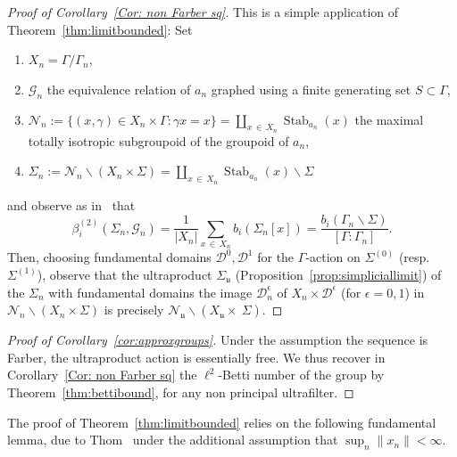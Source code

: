 \documentclass[10pt]{amsart}
\theoremstyle{definition}
\newcommand{\cn}{\mathcal{N}}
\newcommand{\cg}{\mathcal{G}}
\newcommand{\cd}{\mathcal{D}}
\DeclareMathOperator{\Stab}{Stab}
\newcommand{\ul}{\mathfrak{u}}
\newcommand*{\alphenumi}{\renewcommand*{\theenumi}{\alph{enumi}}}
\begin{document}
\begin{proof}[Proof of Corollary~\ref{Cor: non Farber sq}]
This is a simple application of Theorem~\ref{thm:limitbounded}: Set
\begin{enumerate}\alphenumi
\item $X_n=\Gamma/\Gamma_n$,
\item $\cg_n$ the equivalence relation of $a_n$ graphed using a finite generating set $S\subset \Gamma$,
\item $\cn_n:=\{(x,\gamma)\in X_{n}\times \Gamma: \gamma x=x\} =\coprod_{x\,\in\,X_n} \Stab_{a_n}(x) $ the maximal totally isotropic subgroupoid of the groupoid of $a_n$,
\item $\Sigma_n:= \cn_n\backslash\left(X_n\times \Sigma\right)=\coprod_{x\,\in\,X_n} \Stab_{a_n}(x)\backslash \Sigma$
\end{enumerate}
and observe as in~\cite[Proposition~2.3]{berggab} that
\[
\beta^{(2)}_i(\Sigma_n,\cg_n)=\frac{1}{|X_n|}\sum_{x\,\in\,X_n} b_i(\Sigma_n[x])=\frac{b_i(\Gamma_n\backslash \Sigma)}{[\Gamma:\Gamma_n]}.
\]
Then, choosing fundamental domains $\cd^{0}, \cd^{1}$ for the $\Gamma$-action on $\Sigma^{(0)}$ (resp. $\Sigma^{(1)}$), observe that the ultraproduct $\Sigma_\ul$ (Proposition~\ref{prop:simpliciallimit}) of the $\Sigma_n$ with fundamental domains the image $\cd^{\epsilon}_n$ of $X_n\times \cd^{\epsilon}$ (for $\epsilon=0,1$) in $\cn_n\backslash\left(X_n\times \Sigma\right)$ is precisely $\cn_\ul \backslash (X_{\ul}\times~\Sigma)$.
\end{proof}


\begin{proof}[Proof of Corollary~\ref{cor:approxgroups}]
Under the assumption the sequence is Farber, the ultraproduct action is essentially free. We thus recover in Corollary~\ref{Cor: non Farber sq} the $\ell^2$-Betti number of the group by Theorem~\ref{thm:bettibound}, for any non principal ultrafilter.
\end{proof}

The proof of Theorem~\ref{thm:limitbounded} relies on the following fundamental lemma, due to Thom~\cite{thom08} under the additional assumption that $\sup_n \|x_n\|<\infty$.
\end{document}
